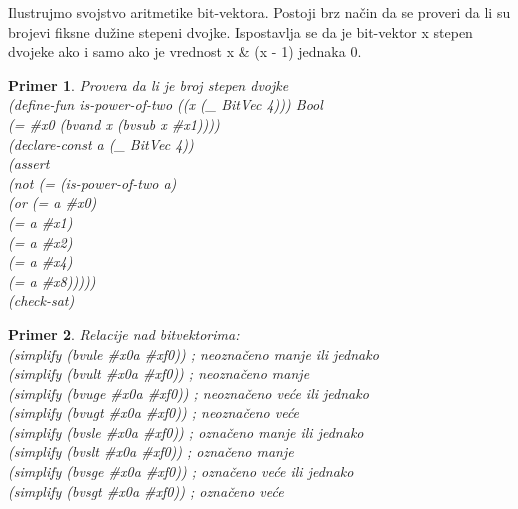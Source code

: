 \documentclass[12pt,oneside]{memoir}
\newtheorem{primer}{Primer}
\begin{document}
Ilustrujmo svojstvo aritmetike bit-vektora. Postoji brz način da se proveri da li su brojevi fiksne dužine stepeni dvojke. 
Ispostavlja se da je bit-vektor x stepen dvojeke ako i samo ako je vrednost
x \& (x - 1) jednaka 0.
\begin{primer} Provera da li je broj stepen dvojke
\\(define-fun is-power-of-two ((x (\_ BitVec 4))) Bool 
\\  (= \#x0 (bvand x (bvsub x \#x1))))
\\(declare-const a (\_ BitVec 4))
\\(assert 
\\ (not (= (is-power-of-two a) 
\\         (or (= a \#x0) 
\\             (= a \#x1) 
\\             (= a \#x2) 
\\             (= a \#x4) 
\\             (= a \#x8)))))
\\(check-sat)
\end{primer}

\begin{primer}
Relacije nad bitvektorima:
\\(simplify (bvule \#x0a \#xf0))  ; neoznačeno manje ili jednako
\\(simplify (bvult \#x0a \#xf0))  ; neoznačeno manje
\\(simplify (bvuge \#x0a \#xf0))  ; neoznačeno veće ili jednako
\\(simplify (bvugt \#x0a \#xf0))  ; neoznačeno veće
\\(simplify (bvsle \#x0a \#xf0))  ; označeno manje ili jednako
\\(simplify (bvslt \#x0a \#xf0))  ; označeno manje
\\(simplify (bvsge \#x0a \#xf0))  ; označeno veće ili jednako
\\(simplify (bvsgt \#x0a \#xf0))  ; označeno veće
\end{primer}
\end{document}
